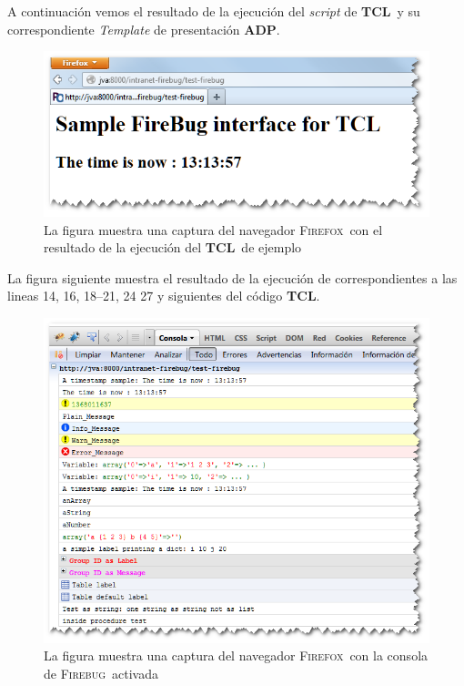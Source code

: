\documentclass{tufte-handout}
\newcommand{\Firebug}{\textsc{Firebug}}%
\newcommand{\Firefox}{\textsc{Firefox}}%
\newcommand{\TCL}{\textbf{TCL}}%
\newcommand{\ADP}{\textbf{ADP}}%
\begin{document}



A continuación vemos el resultado de la ejecución del \emph{script} de \TCL\ y su correspondiente \emph{Template} de presentación \ADP.
\begin{figure}
  \includegraphics{fb-01-ok.png}%
  \caption{La figura muestra una captura del navegador \Firefox\ con el resultado de la ejecución del \TCL\ de ejemplo}%
  \label{fig:ff-html}%
\end{figure}

La figura siguiente muestra el resultado de la ejecución de correspondientes a las lineas
14, 16, 18--21, 24 27 y siguientes del código \TCL. 
\begin{figure}
  \includegraphics{fb-02-ok-ok.png}%
  \caption{La figura muestra una captura del navegador \Firefox\ con la consola de \Firebug\ activada}%
  \label{fig:ff-consola}%
\end{figure}
\end{document}
